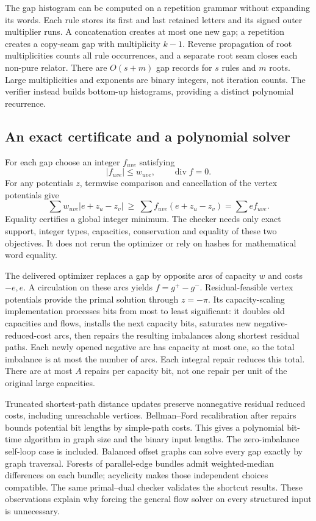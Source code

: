 The gap histogram can be computed on a repetition grammar without expanding
its words. Each rule stores its first and last retained letters and its
signed outer multiplier runs. A concatenation creates at most one new gap;
a repetition creates a copy-seam gap with multiplicity $k-1$. Reverse
propagation of root multiplicities counts all rule occurrences, and a
separate root seam closes each non-pure relator. There are $O(s+m)$ gap
records for $s$ rules and $m$ roots. Large multiplicities and exponents are
binary integers, not iteration counts. The verifier instead builds
bottom-up histograms, providing a distinct polynomial recurrence.

\subsection{An exact certificate and a polynomial solver}

For each gap choose an integer $f_{uve}$ satisfying
\[
 |f_{uve}|\le w_{uve},\qquad \operatorname{div}f=0.
\]
For any potentials $z$, termwise comparison and cancellation of the vertex
potentials give
\[
 \sum w_{uve}|e+z_u-z_v|\ \ge\
 \sum f_{uve}(e+z_u-z_v)=\sum e f_{uve}.
\]
Equality certifies a global integer minimum. The checker needs only exact
support, integer types, capacities, conservation and equality of these two
objectives. It does not rerun the optimizer or rely on hashes for mathematical
word equality.

The delivered optimizer replaces a gap by opposite arcs of capacity $w$ and
costs $-e,e$. A circulation on these arcs yields $f=g^+-g^-$. Residual-feasible
vertex potentials provide the primal solution through $z=-\pi$. Its
capacity-scaling implementation processes bits from most to least significant:
it doubles old capacities and flows, installs the next capacity bits, saturates
new negative-reduced-cost arcs, then repairs the resulting imbalances along
shortest residual paths. Each newly opened negative arc has capacity at most
one, so the total imbalance is at most the number of arcs. Each integral
repair reduces this total. There are at most $A$ repairs per capacity bit,
not one repair per unit of the original large capacities.

Truncated shortest-path distance updates preserve nonnegative residual
reduced costs, including unreachable vertices. Bellman--Ford recalibration
after repairs bounds potential bit lengths by simple-path costs. This gives
a polynomial bit-time algorithm in graph size and the binary input lengths.
The zero-imbalance self-loop case is included. Balanced offset graphs can
solve every gap exactly by graph traversal. Forests of parallel-edge bundles
admit weighted-median differences on each bundle; acyclicity makes those
independent choices compatible. The same primal--dual checker validates the
shortcut results. These observations explain why forcing the general flow
solver on every structured input is unnecessary.

